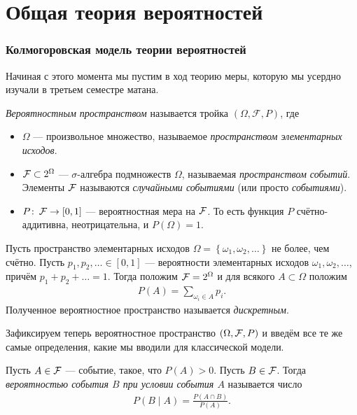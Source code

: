 \documentclass[../main.tex]{subfiles}
\begin{document}
\newpage
\part{Общая теория вероятностей}
\section{Колмогоровская модель теории вероятностей}

Начиная с этого момента мы пустим в ход теорию меры, которую мы усердно изучали в третьем семестре матана. 

\begin{df}
 \textit{Вероятностным пространством} называется тройка $(\Omega, \mathcal F, P)$, где
 \begin{itemize}
  \item $\Omega$ --- произвольное множество, называемое \textit{пространством элементарных исходов}.
  \item $\mathcal F \subset 2^{\Omega}$ --- $\sigma$-алгебра подмножеств $\Omega$, называемая \textit{пространством событий}. Элементы $\mathcal F$ называются \textit{случайными событиями} (или просто \textit{событиями}).
  \item $P \colon\, \mathcal F \to [0,1]$ --- вероятностная мера на $\mathcal F$. То есть функция $P$ счётно-аддитивна, неотрицательна, и $P(\Omega) = 1$.
 \end{itemize}
\end{df}
\begin{exmpl}
 Пусть пространство элементарных исходов $\Omega = \left\{ \omega_1, \omega_2, \ldots \right\}$ не более, чем счётно. Пусть $p_1, p_2, \ldots \in [0,1]$ --- вероятности элементарных исходов $\omega_1, \omega_2, \ldots$, причём $p_1 + p_2 + \ldots  = 1$. Тогда положим $\mathcal F = 2^{\Omega}$ и для всякого $A \subset \Omega$ положим
 \begin{align*}
  P(A) = \sum_{\omega_i \in A} p_i.
 \end{align*} Полученное вероятностное пространство называется \textit{дискретным}.
\end{exmpl}

Зафиксируем теперь вероятностное пространство $(\Omega, \mathcal F, P)$ и введём все те же самые определения, какие мы вводили для классической модели. 

\begin{df}
 Пусть $A \in \mathcal F$ --- событие, такое, что $P(A) > 0$. Пусть $B \in \mathcal F$. Тогда \textit{вероятностью события $B$ при условии события $A$} называется число
 \begin{align*}
  P(B \mid A) = \frac{P(A\cap B)}{P(A)}.
 \end{align*}
\end{df}
\end{document}
